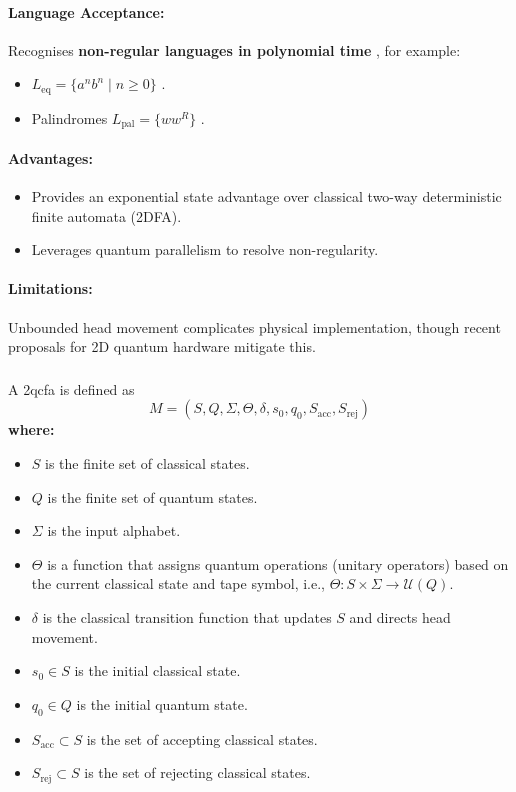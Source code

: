 \paragraph{Language Acceptance:}  
Recognises \textbf{non-regular languages in polynomial time} , for example:
\begin{itemize}
    \item \( L_{\text{eq}} = \{a^n b^n \mid n \geq 0\} \) \cite{kondacs1997power}.
    \item Palindromes \( L_{\text{pal}} = \{ww^R\} \) \cite{yakaryilmaz2010succinctness}.
\end{itemize}

\paragraph{Advantages:}
\begin{itemize}
    \item Provides an exponential state advantage over classical two-way deterministic finite automata (2DFA).
    \item Leverages quantum parallelism to resolve non-regularity.
\end{itemize}

\paragraph{Limitations:}
Unbounded head movement complicates physical implementation, though recent proposals for 2D quantum hardware mitigate this.

\subsubsection{}
\label{subsec:2qcfa}
\begin{definition}
A \gls{2qcfa} is defined as 
\[
M = (S, Q, \Sigma, \Theta, \delta, s_0, q_0, S_{\text{acc}}, S_{\text{rej}})
\]
\textbf{where:}
\begin{itemize}
    \item \( S \) is the finite set of classical states.
    \item \( Q \) is the finite set of quantum states.
    \item \( \Sigma \) is the input alphabet.
    \item \( \Theta \) is a function that assigns quantum operations (unitary operators) based on the current classical state and tape symbol, i.e., \(\Theta: S \times \Sigma \to \mathcal{U}(Q)\).
    \item \( \delta \) is the classical transition function that updates \( S \) and directs head movement.
    \item \( s_0 \in S \) is the initial classical state.
    \item \( q_0 \in Q \) is the initial quantum state.
    \item \( S_{\text{acc}} \subset S \) is the set of accepting classical states.
    \item \( S_{\text{rej}} \subset S \) is the set of rejecting classical states.
\end{itemize}
\end{definition}

